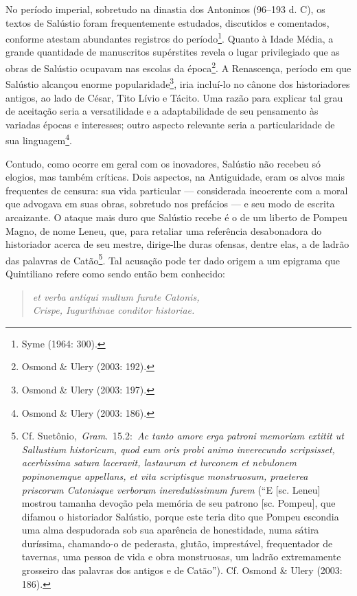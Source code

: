 No período imperial, sobretudo na dinastia dos Antoninos (96--193 d. C), os
textos de Salústio foram frequentemente estudados, discutidos e comentados,
conforme atestam abundantes registros do período\footnote{Syme (1964: 300).}.
Quanto à Idade Média, a grande quantidade de manuscritos supérstites revela o
lugar privilegiado que as obras de Salústio ocupavam nas escolas da
época\footnote{Osmond \& Ulery (2003: 192).}. A Renascença, período em que
Salústio alcançou enorme popularidade\footnote{Osmond \& Ulery (2003: 197).},
iria incluí-lo no cânone dos historiadores antigos, ao lado de César, Tito
Lívio e Tácito. Uma razão para explicar tal grau de aceitação seria a
versatilidade e a adaptabilidade de seu pensamento às variadas épocas e
interesses; outro aspecto relevante seria a particularidade de sua
linguagem\footnote{Osmond \& Ulery (2003: 186).}. 

Contudo, como ocorre em geral com os inovadores, Salústio não recebeu só
elogios, mas também críticas. Dois aspectos, na Antiguidade, eram os alvos mais
frequentes de censura: sua vida particular --- considerada incoerente com a
moral que advogava em suas obras, sobretudo nos prefácios --- e seu modo de 
escrita arcaizante.  O ataque mais duro que Salústio recebe é o de um liberto
de Pompeu Magno, de nome Leneu, que, para retaliar uma referência desabonadora
do historiador acerca de seu mestre, dirige-lhe duras ofensas, dentre elas, a
de ladrão das palavras de Catão\footnote{Cf. Suetônio, \emph{Gram}. 15.2: \emph{Ac tanto amore erga patroni memoriam extitit ut Sallustium historicum, quod eum oris probi animo inverecundo scripsisset, acerbissima satura laceravit, lastaurum et lurconem et nebulonem popinonemque appellans, et vita scriptisque monstruosum, praeterea priscorum Catonisque verborum ineredutissimum furem}
(“E [sc. Leneu] mostrou tamanha devoção pela memória de seu patrono [sc. Pompeu], que difamou o historiador Salústio, porque este teria dito que Pompeu escondia uma alma despudorada sob sua aparência de honestidade, numa sátira duríssima, chamando-o de pederasta, glutão, imprestável, frequentador de tavernas, uma pessoa de vida e obra monstruosas, um ladrão extremamente grosseiro das palavras dos antigos e de Catão”). Cf. Osmond \& Ulery (2003: 186).}. Tal acusação pode ter dado origem a um epigrama que
Quintiliano refere como sendo então bem conhecido: 

\begin{verse}
\emph{et verba antiqui
multum furate Catonis,\\ Crispe, Iugurthinae conditor historiae.} 

\end{verse}
 



